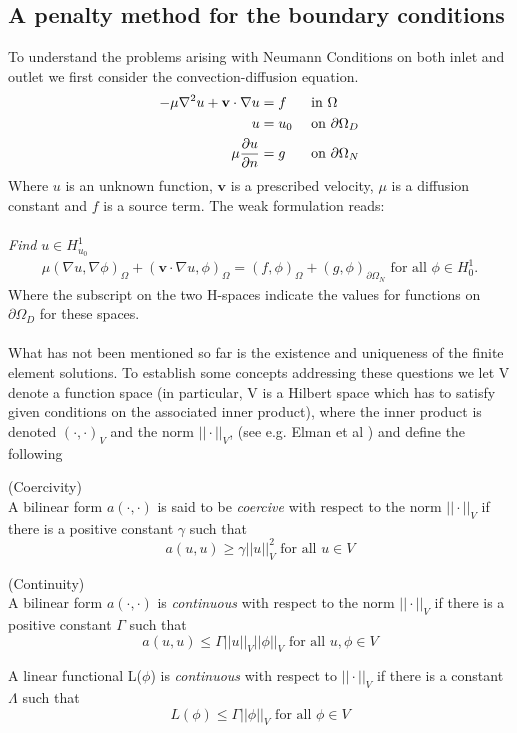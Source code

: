 \subsection{A penalty method for the boundary conditions}
To understand the problems arising with Neumann Conditions on both inlet and outlet we first consider the convection-diffusion equation. 
\begin{alignat}{3}
-\mu \nabla ^2 u + \mathbf{v}\cdot\nabla u & = f && \text{ in } \Omega \\
u & = u_0 && \text{ on } \partial \Omega_D \\
\mu \frac{\partial u}{\partial n} & = g && \text{ on } \partial \Omega_N \label{ConvDiff}
\end{alignat}
Where $u$ is an unknown function, $\mathbf{v}$ is a prescribed velocity, $\mu$ is a diffusion constant and $f$ is a source term. The weak formulation reads:
\\
\\
\textit{Find } $u \in H^1_{u_0}$
\begin{align}
\mu (\nabla u, \nabla \phi)_\Omega+ (\mathbf{v} \cdot \nabla u, \phi)_\Omega = (f,\phi)_\Omega + (g,\phi)_{\partial \Omega_N} \text{ for all } \phi \in H^1_{0}.
\end{align}
Where the subscript on the two H-spaces indicate the values for functions on $\partial \Omega_D$ for these spaces. 
\\
\\
What has not been mentioned so far is the existence and uniqueness of the finite element solutions. To establish some concepts addressing these questions we let V denote a function space (in particular, V is a Hilbert space which has to satisfy given conditions on the associated inner product), where the inner product is denoted $(\cdot,\cdot)_V$ and the norm $||\cdot||_V$, (see e.g. Elman et al \cite{Elma14}) and define the following
\begin{definition}{(Coercivity)} \\
A bilinear form $a(\cdot,\cdot)$ is said to be \textit{coercive} with respect to the norm $||\cdot||_V$ if there is a positive constant $\gamma$ such that 
\[ a(u,u) \geq \gamma ||u||_V^2 \text{ for all } u \in V \]
\end{definition}
\begin{definition}{(Continuity)} \\
A bilinear form $a(\cdot,\cdot)$ is \textit{continuous} with respect to the norm $||\cdot||_V$ if there is a positive constant $\Gamma$ such that 
\[ a(u,u) \leq \Gamma ||u||_V||\phi||_V \text{ for all } u,\phi \in V \]

A linear functional L($\phi$) is \textit{continuous} with respect to $||\cdot||_V$ if there is a constant $\Lambda$ such that
\[ L(\phi) \leq \Gamma ||\phi||_V \text{ for all } \phi \in V \]
\end{definition}

